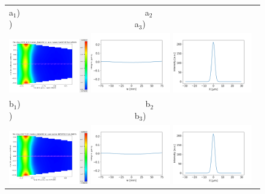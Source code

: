 \documentclass{iucr}              %
\begin{document}
  \begin{figure}
  \begin{center}
   \begin{tabular}{l} 
   a$_1$)~~~~~~~~~~~~~~~~~~~~~~~~~~~~~
   a$_2$)~~~~~~~~~~~~~~~~~~~~~~~~~~~~~a$_3$)\\
   \includegraphics[width=0.32\textwidth]{figures/cryogenic2d.png} 
   \includegraphics[width=0.32\textwidth]{figures/deformationcryogenic1d.png}
   \includegraphics[width=0.32\textwidth]{figures/intensitycryogenic.png} \\

  b$_1$)~~~~~~~~~~~~~~~~~~~~~~~~~~~~~
  b$_2$)~~~~~~~~~~~~~~~~~~~~~~~~~~~~~b$_3$)\\
  \includegraphics[width=0.32\textwidth]{figures/cryogenic2dKh.png}
  \includegraphics[width=0.32\textwidth]{figures/deformationcryogenic1dKh.png}
  \includegraphics[width=0.32\textwidth]{figures/intensitycryogenicKh.png} \\
   

\end{tabular}
\end{center}
\end{figure}
\end{document}
